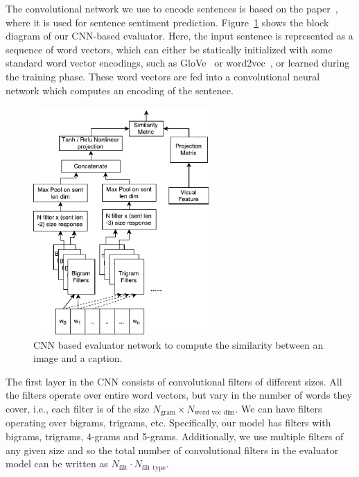 The convolutional network we use to encode sentences is based on the
paper~\cite{kim:2014:CNNsent}, where it is used for sentence sentiment
prediction.
Figure~\ref{fig:CNNEval} shows the block diagram of our CNN-based evaluator.  
Here, the input sentence is represented as a sequence of word vectors, which can
either be statically initialized with some standard word vector encodings, such
as GloVe~\cite{pennington2014glove} or word2vec~\cite{mikolov2013distributed},
or learned during the training phase.
These word vectors are fed into a convolutional neural network which computes an
encoding of the sentence.


\begin{figure}[t] 
  \centering
  \includegraphics[width=0.6\textwidth]{./images/CnnEval.pdf} 
  \caption{CNN based evaluator network to compute the similarity between 
    an image and a caption.}
  \label{fig:CNNEval} 
\end{figure}


The first layer in the CNN consists of convolutional filters of different sizes.  
All the filters operate over entire word vectors, but vary in the number of
words they cover, i.e., each filter is of the size $N_{\text{gram}} \times
N_{\text{word vec dim}}$. 
We can have filters operating over bigrams, trigrams, etc.
Specifically, our model has filters with bigrams, trigrams, 4-grams and 5-grams. 
Additionally, we use multiple filters of any given size and so the total number
of convolutional filters in the evaluator model can be written as
$N_{\text{filt}} \cdot N_{\text{filt type}}$.

